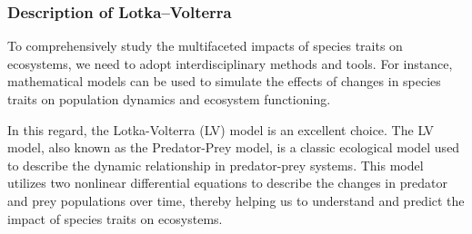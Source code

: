 \documentclass[CTeX = true]{mcmthesis}  %
\begin{document}


\subsubsection{Description of Lotka–Volterra}
To comprehensively study the multifaceted impacts of species traits on ecosystems, we need to adopt interdisciplinary methods and tools. For instance, mathematical models can be used to simulate the effects of changes in species traits on population dynamics and ecosystem functioning.

In this regard, the Lotka-Volterra (LV) model is an excellent choice. The LV model, also known as the Predator-Prey model, is a classic ecological model used to describe the dynamic relationship in predator-prey systems. This model utilizes two nonlinear differential equations to describe the changes in predator and prey populations over time, thereby helping us to understand and predict the impact of species traits on ecosystems.
\end{document}
